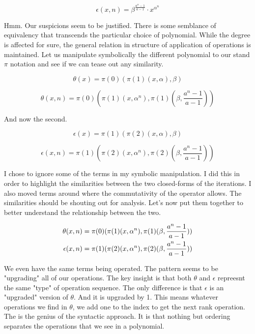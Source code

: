 \documentclass[12pt]{article}
\begin{document}
\begin{equation}
    \epsilon(x,n) = \beta^{\frac{a^n-1}{a-1}} \cdot x^{\alpha^n}
\end{equation}

Hmm. Our suspicions seem to be justified. There is some semblance of
equivalency that transcends the particular choice of polynomial. While the
degree is affected for sure, the general relation in structure of application
of operations is maintained. Let us manipulate symbolically the different
polynomial to our stand $\pi$ notation and see if we can tease out any
similarity.

\begin{equation}
    \theta(x) = \pi(0)(\pi(1)(x, \alpha), \beta)
\end{equation}

\begin{equation}
    \theta(x,n) = \pi(0)(\pi(1)(x, \alpha^n), \pi(1)(\beta, \frac{a^n-1}{a-1}))
\end{equation}

And now the second.

\begin{equation}
    \epsilon(x) = \pi(1)(\pi(2)(x, \alpha), \beta)
\end{equation}

\begin{equation}
    \epsilon(x,n) = \pi(1)(\pi(2)(x, \alpha^n), \pi(2)(\beta, \frac{a^n-1}{a-1}))
\end{equation}

I chose to ignore some of the terms in my symbolic manipulation. I did this in
order to highlight the similarities between the two closed-forms of the
iterations. I also moved terms around where the commutativity of the operator
allows. The similarities should be shouting out for analysis. Let's now put
them together to better understand the relationship between the two.

\begin{align}
    \theta(x,n) = \pi(0)(\pi(1)(x, \alpha^n), \pi(1)(\beta, \frac{a^n-1}{a-1})) \notag \\
    \epsilon(x,n) = \pi(1)(\pi(2)(x, \alpha^n), \pi(2)(\beta, \frac{a^n-1}{a-1})) \notag
\end{align}

We even have the same terms being operated. The pattern seems to be "upgrading"
all of our operations. The key insight is that both $\theta$ and $\epsilon$
repreesnt the same "type" of operation sequence. The only difference is that
$\epsilon$ is an "upgraded" version of $\theta$. And it is upgraded by 1. This
means whatever operations we find in $\theta$, we add one to the index to get
the next rank operation. The is the genius of the syntactic approach. It is
that nothing but ordering separates the operations that we see in a polynomial.
\end{document}
